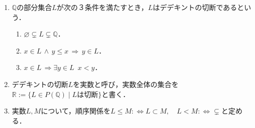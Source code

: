 \documentclass[uplatex,dvipdfmx]{jsreport}
\begin{document}
\begin{definition}\mbox{}
    \begin{enumerate}
        \item $\mathbb{Q}$の部分集合$L$が次の３条件を満たすとき，$L$はデデキントの切断であるという．
        \begin{enumerate}[(1)]
            \item $\varnothing\subsetneq L\subsetneq\mathbb{Q}$．
            \item $x\in L \,\wedge\, y\le x \,\Rightarrow\, y\in L$．
            \item $x\in L \,\Rightarrow \exists y\in L \,\,\, x<y$．
        \end{enumerate}
        \item デデキントの切断$L$を実数と呼び，実数全体の集合を$\mathbb{R}:=\{ L\in P(\mathbb{Q})\mid Lは切断\}$と書く．
        \item 実数$L,M$について，順序関係を$L\le M :\Leftrightarrow L\subset M,\hspace{1em} L<M :\Leftrightarrow \subsetneq$と定める．
    \end{enumerate}
\end{definition}
\end{document}
